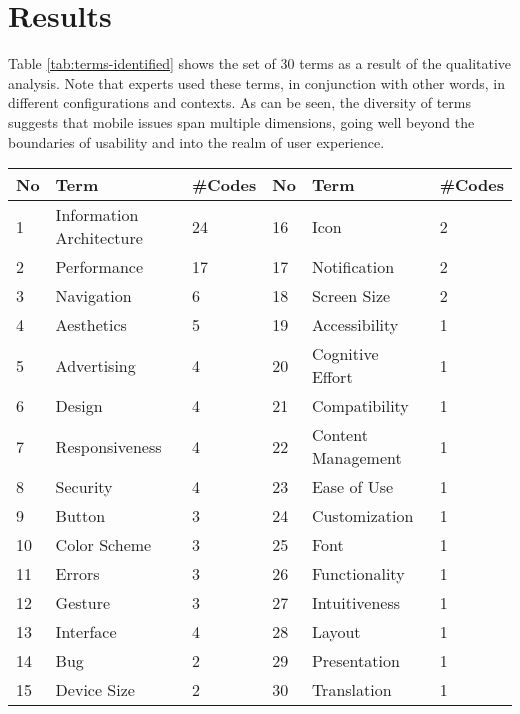 \documentclass[preprint,12pt,number]{elsarticle}
\begin{document}
\section{Results}
\label{sec:results}
Table \ref{tab:terms-identified} shows the set of 30 terms as a result of the qualitative analysis. Note that experts used these terms, in conjunction with other words, in different configurations and contexts. As can be seen, the diversity of terms suggests that mobile issues span multiple dimensions, going well beyond the boundaries of usability and into the realm of user experience.

\begin{table*}[h]
\caption{Extracted terms from expert responses with number of codes assigned}
\label{tab:terms-identified}
\footnotesize
\centering
\begin{tabular}{|l|l|l|l|l|l|}
\hline
\textbf{No} & \textbf{Term}   & \textbf{\#Codes} & \textbf{No} & \textbf{Term}  & \textbf{\#Codes} \\ \hline
1  & Information Architecture & 24      & 16 & Icon               & 2       \\ \hline
2  & Performance              & 17      & 17 & Notification       & 2       \\ \hline
3  & Navigation               & 6       & 18 & Screen Size        & 2       \\ \hline
4  & Aesthetics               & 5       & 19 & Accessibility      & 1       \\ \hline
5  & Advertising              & 4       & 20 & Cognitive Effort   & 1       \\ \hline
6  & Design                   & 4       & 21 & Compatibility      & 1       \\ \hline
7  & Responsiveness           & 4       & 22 & Content Management & 1       \\ \hline
8  & Security                 & 4       & 23 & Ease of Use        & 1       \\ \hline
9  & Button                   & 3       & 24 & Customization      & 1       \\ \hline
10 & Color Scheme             & 3       & 25 & Font               & 1       \\ \hline
11 & Errors                   & 3       & 26 & Functionality      & 1       \\ \hline
12 & Gesture                  & 3       & 27 & Intuitiveness      & 1       \\ \hline
13 & Interface                & 4       & 28 & Layout             & 1       \\ \hline
14 & Bug                      & 2       & 29 & Presentation       & 1       \\ \hline
15 & Device Size              & 2       & 30 & Translation        & 1       \\ \hline
\end{tabular}
\end{table*}
\end{document}
